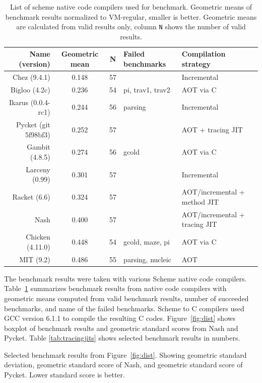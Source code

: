 \documentclass[preprint, 10pt]{sigplanconf}
\begin{document}
\begin{table}
  \centering
  \begin{tabular}{rccll}
    Name (version) & Geometric mean & N & Failed benchmarks & Compilation
    strategy \\
    \toprule
    Chez (9.4.1) &  0.148 & 57 & & Incremental \\
    Bigloo (4.2c) & 0.236 & 54 & pi, trav1, trav2 & AOT via C \\
    Ikarus (0.0.4-rc1) & 0.244 & 56 & parsing & Incremental \\
    Pycket (git 5f98bf3) & 0.252 & 57 & & AOT + tracing JIT \\
    Gambit (4.8.5) & 0.274 & 56 & gcold & AOT via C \\
    Larceny (0.99) &  0.301 & 57 & & Incremental \\
    Racket  (6.6) &  0.324 & 57 & & AOT/incremental + method JIT \\
    Nash & 0.400 & 57 & & AOT/incremental + tracing JIT \\
    Chicken (4.11.0) & 0.448 & 54 & gcold, maze, pi & AOT via C \\
    MIT (9.2) &  0.486 & 55 & parsing, nucleic & AOT \\
  \end{tabular}
  \caption{List of scheme native code compilers used for benchmark. Geometric
    means of benchmark results normalized to VM-regular, smaller is
    better. Geometric means are calculated from valid results only, column
    \texttt{N} shows the number of valid results.}
\label{tab:nativecomp}
\end{table}

The benchmark results were taken with various Scheme native code compilers.
Table~\hyperref[tab:impls]{\ref{tab:nativecomp}} summarizes benchmark results
from native code compilers with geometric means computed from valid benchmark
results, number of succeeded benchmarks, and name of the failed
benchmarks. Scheme to C compilers used GCC version 6.1.1 to compile the
resulting C codes. Figure~\hyperref[fig:dist]{\ref{fig:dist}} shows boxplot of
benchmark results and geometric standard scores from Nash and Pycket. Table
\hyperref[tab:tracingjits]{\ref{tab:tracingjits}} shows selected benchmark
results in numbers.

\begin{table}
  \centering
  
  \caption{Selected benchmark results from
    Figure~\hyperref[fig:dist]{\ref{fig:dist}}. Showing geometric standard
    deviation, geometric standard score of Nash, and geometric standard score
    of Pycket. Lower standard score is better.}
\label{tab:tracingjits}
\end{table}
\end{document}

